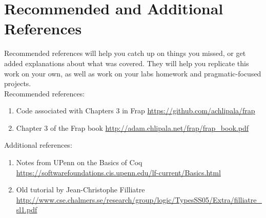 \documentclass{article}
\begin{document}
\section{Recommended and Additional References}

Recommended references will help you catch up on things you missed, or get added explanations about what was covered. They will help you replicate this work on your own, as well as work on your labs homework and pragmatic-focused projects. \\

Recommended references:
\begin{enumerate}
    \item Code associated with Chapters 3 in Frap \href{https://github.com/achlipala/frap}{https://github.com/achlipala/frap}
    \item Chapter 3 of the Frap book \href{http://adam.chlipala.net/frap/frap\_book.pdf}{http://adam.chlipala.net/frap/frap\_book.pdf}
\end{enumerate}

Additional references:
\begin{enumerate}
    \item Notes from UPenn on the Basics of Coq \href{https://softwarefoundations.cis.upenn.edu/lf-current/Basics.html}{https://softwarefoundations.cis.upenn.edu/lf-current/Basics.html}
    \item Old tutorial by Jean-Christophe Filliatre\\ \href{http://www.cse.chalmers.se/research/group/logic/TypesSS05/Extra/filliatre\_sl1.pdf}{http://www.cse.chalmers.se/research/group/logic/TypesSS05/Extra/filliatre\_sl1.pdf}
\end{enumerate}
\end{document}
